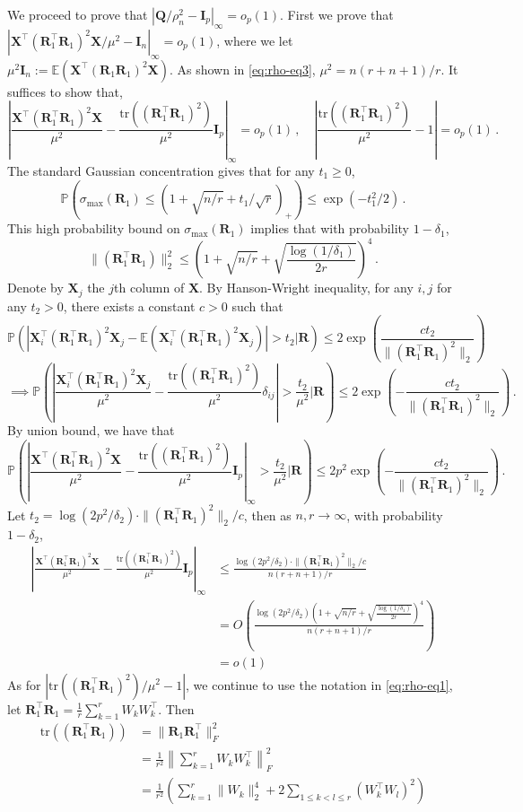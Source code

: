 \documentclass[11pt]{article}
\newcommand{\bX}{\boldsymbol{X}}
\newcommand{\bI}{\boldsymbol{I}}
\newcommand{\bR}{\boldsymbol{R}}
\newcommand{\bQ}{\boldsymbol{Q}}
\newcommand{\Expected}{\mathbb{E}}
\newcommand{\Prob}{\mathbb{P}}
\begin{document}
We proceed to prove that $|\bQ/\rho_n^2-\bI_p|_\infty=o_p(1)$. First we prove that $|\bX^{\top}(\bR_1^\top\bR_1)^2\bX/\mu^2-\bI_n|_\infty=o_p(1)$, where we let $\mu^2\bI_n:=\Expected(\bX^\top(\bR_1\bR_1)^2\bX)$. As shown in \eqref{eq:rho-eq3}, $\mu^2 = n(r+n+1)/r$. It suffices to show that,
\[
\left|\frac{\bX^{\top}(\bR_1^\top\bR_1)^2\bX}{\mu^2}-\frac{\mbox{tr}((\bR_1^\top\bR_1)^2)}{\mu^2}\bI_p\right|_\infty=o_p(1)\,,\quad\left|\frac{\mbox{tr}((\bR_1^\top\bR_1)^2)}{\mu^2}-1\right|=o_p(1)\,.
\]
The standard Gaussian concentration gives that for any $t_1\ge 0$,
\[
\Prob\left(\sigma_{\max}(\bR_1)\le \left(1+\sqrt{n/r}+t_1/\sqrt{r}\right)_+\right)\leq \exp(-t_1^2/2)\,.
\]
This high probability bound on $\sigma_{\max}(\bR_1)$ implies that with probability $1-\delta_1$,
\[
\|(\bR_1^\top\bR_1)\|_2^2\le \left(1+\sqrt{n/r}+\sqrt{\frac{\log(1/\delta_1)}{2r}}\right)^4\,.
\]
Denote by $\bX_j$ the $j$th column of $\bX$. By Hanson-Wright inequality, for any $i,j$ for any $t_2>0$, there exists a constant $c>0$ such that
\[
\Prob\left(|\bX_i^\top (\bR_1^\top \bR_1)^2\bX_j-\Expected(\bX_i^\top (\bR_1^\top \bR_1)^2\bX_j)|>t_2|\bR\right)\le 2\exp\left(\frac{ct_2}{\|(\bR_1^\top\bR_1)^2\|_2}\right)
\]
\[
\implies\Prob\left(\left|\frac{\bX_i^\top (\bR_1^\top \bR_1)^2\bX_j}{\mu^2}-\frac{\mbox{tr}((\bR_1^\top \bR_1)^2)}{\mu^2}\mathbb \delta_{ij}\right| >\frac{t_2}{\mu^2} \bigg |\bR\right)\le 2\exp\left(-\frac{ct_2}{\|(\bR_1^\top\bR_1)^2\|_2}\right)\,.
\]
By union bound, we have that
\[
\Prob\left(\left|\frac{\bX^{\top}(\bR_1^\top\bR_1)^2\bX}{\mu^2}-\frac{\mbox{tr}((\bR_1^\top\bR_1)^2)}{\mu^2}\bI_p\right|_\infty >\frac{t_2}{\mu^2} \bigg |\bR\right)\le 2p^2\exp\left(-\frac{ct_2}{\|(\bR_1^\top\bR_1)^2\|_2}\right)\,.
\]
Let $t_2 = \log(2p^2/\delta_2)\cdot \|(\bR_1^\top\bR_1)^2\|_2/c$, then as $n,r \to \infty$, with probability $1-\delta_2$, 
\begin{align*}
    \left|\frac{\bX^\top (\bR_1^\top \bR_1)^2\bX}{\mu^2}-\frac{\mbox{tr}((\bR_1^\top \bR_1)^2)}{\mu^2}\bI_p\right|_\infty &\le \frac{\log(2p^2/\delta_2)\cdot \|(\bR_1^\top\bR_1)^2\|_2/c}{n(r+n+1)/r}\\
    &= O\left(\frac{\log(2p^2/\delta_2)\left(1+\sqrt{n/r}+\sqrt{\frac{\log(1/\delta_1)}{2r}}\right)^4}{n(r+n+1)/r}\right)\\
    &= o(1)
\end{align*}
As for $|\mbox{tr}((\bR_1^\top \bR_1)^2)/\mu^2-1|$, we continue to use the notation in \eqref{eq:rho-eq1}, let $\bR_1^\top \bR_1 = \frac{1}{r}\sum_{k =1}^rW_kW_k^\top$. Then
\begin{align*}
    \mbox{tr}\left(\left(\bR_1^\top\bR_1\right)\right) &=\|\bR_1\bR_1^\top\|_F^2\\
        &=\frac{1}{r^2}\left\|\sum_{k=1}^rW_kW_k^\top\right\|_F^2\\
        &=\frac{1}{r^2}\left(\sum_{k=1}^r\|W_k\|_2^4+2\sum_{1\le k<l\le r}(W_k^\top W_l)^2\right)
\end{align*}
\end{document}
